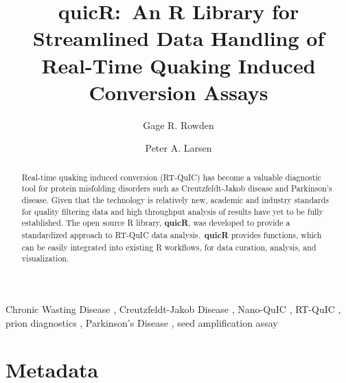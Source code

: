 \documentclass[preprint,12pt,a4paper]{elsarticle}
\begin{document}
    \renewcommand{\labelenumii}{\arabic{enumi}.\arabic{enumii}}

    \begin{frontmatter}

        \title{\textbf{quicR}:\ An R Library for Streamlined Data Handling of Real-Time Quaking Induced Conversion Assays}
        \author[label1,label2,label3]{Gage R. Rowden}
        \author[label1,label2,label3]{Peter A. Larsen}
        \address[label1]{Department of Veterinary and Biomedical Sciences, University of Minnesota, USA.}
        \address[label2]{Minnesota Center for Prion Research and Outreach, University of Minnesota, USA.}
        \address[label3]{Priogen Corp., USA.}

        \begin{abstract}
            Real-time quaking induced conversion (RT-QuIC) has become a valuable diagnostic tool for protein misfolding disorders such as Creutzfeldt-Jakob disease and Parkinson's disease. Given that the technology is relatively new, academic and industry standards for quality filtering data and high throughput analysis of results have yet to be fully established. The open source R library, \textbf{quicR}, was developed to provide a standardized approach to RT-QuIC data analysis.\ \textbf{quicR} provides functions, which can be easily integrated into existing R workflows, for data curation, analysis, and visualization.
        \end{abstract}

        \begin{keyword}
            Chronic Wasting Disease \sep{} Creutzfeldt-Jakob Disease \sep{} Nano-QuIC \sep{} RT-QuIC \sep{} prion diagnostics \sep{} Parkinson's Disease \sep{} seed amplification assay
        \end{keyword}

    \end{frontmatter}


    \section*{Metadata}
\end{document}
